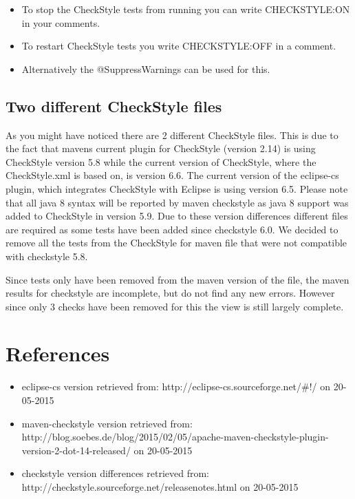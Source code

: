 \documentclass[11pt,a4paper]{report}
\begin{document}
\begin{itemize}

\item To stop the CheckStyle tests from running you can write CHECKSTYLE:ON in your comments.

\item To restart CheckStyle tests you write CHECKSTYLE:OFF in a comment.

\item Alternatively the @SuppressWarnings can be used for this.

\end{itemize}

\section{Two different CheckStyle files}

As you might have noticed there are 2 different CheckStyle files. This is due to the fact that mavens current plugin for CheckStyle (version 2.14) is using CheckStyle version 5.8 while the current version of CheckStyle, where the CheckStyle.xml is based on, is version 6.6. The current version of the eclipse-cs plugin, which integrates CheckStyle with Eclipse is using version 6.5. Please note that all java 8 syntax will be reported by maven checkstyle as java 8 support was added to CheckStyle in version 5.9. Due to these version differences different files are required as some tests have been added since checkstyle 6.0. We decided to remove all the tests from the CheckStyle for maven file that were not compatible with checkstyle 5.8.

Since tests only have been removed from the maven version of the file, the maven results for checkstyle are incomplete, but do not find any new errors. However since only 3 checks have been removed for this the view is still largely complete.

\chapter{References}

\begin{itemize}

\item eclipse-cs version retrieved from: http://eclipse-cs.sourceforge.net/\#!/ on 20-05-2015

\item maven-checkstyle version retrieved from: http://blog.soebes.de/blog/2015/02/05/apache-maven-checkstyle-plugin-version-2-dot-14-released/ on 20-05-2015

\item checkstyle version differences retrieved from: http://checkstyle.sourceforge.net/releasenotes.html on 20-05-2015

\end{itemize}
\end{document}
